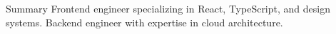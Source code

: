 \begin{rSection}{Summary}
\iffrontend
Frontend engineer specializing in React, TypeScript, and design systems.
\else
Backend engineer with expertise in cloud architecture.
\fi
\end{rSection}